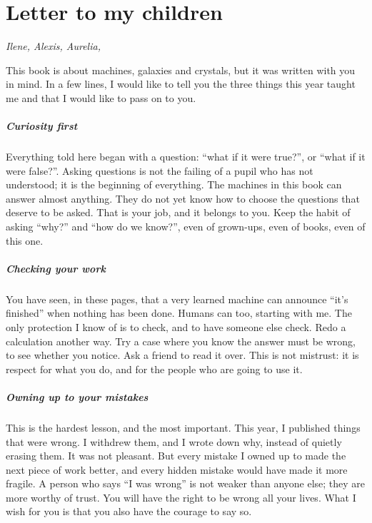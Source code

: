 \chapter*{Letter to my children}

\noindent\emph{Ilene, Alexis, Aurelia,}

\medskip
This book is about machines, galaxies and crystals, but it was written with you in mind. In a few lines, I would like
to tell you the three things this year taught me and that I would like to pass on to you.

\paragraph{Curiosity first} Everything told here began with a question: ``what if it were true?'', or ``what if it were
false?''. Asking questions is not the failing of a pupil who has not understood; it is the beginning of everything.
The machines in this book can answer almost anything. They do not yet know how to choose the questions that deserve to
be asked. That is your job, and it belongs to you. Keep the habit of asking ``why?'' and ``how do we know?'', even of
grown-ups, even of books, even of this one.

\paragraph{Checking your work} You have seen, in these pages, that a very learned machine can announce ``it's finished''
when nothing has been done. Humans can too, starting with me. The only protection I know of is to check, and to have
someone else check. Redo a calculation another way. Try a case where you know the answer must be wrong, to see whether
you notice. Ask a friend to read it over. This is not mistrust: it is respect for what you do, and for the people who
are going to use it.

\paragraph{Owning up to your mistakes} This is the hardest lesson, and the most important. This year, I published things
that were wrong. I withdrew them, and I wrote down why, instead of quietly erasing them. It was not pleasant. But every
mistake I owned up to made the next piece of work better, and every hidden mistake would have made it more fragile. A
person who says ``I was wrong'' is not weaker than anyone else; they are more worthy of trust. You will have the right
to be wrong all your lives. What I wish for you is that you also have the courage to say so.

